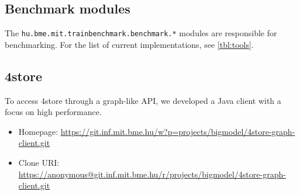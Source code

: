 \subsection{Benchmark modules}

The \texttt{hu.bme.mit.trainbenchmark.benchmark.*} modules are responsible for benchmarking. For the list of current implementations, see \autoref{tbl:tools}.

\subsection{4store}

To access 4store through a graph-like API, we developed a Java client with a focus on high performance.

\begin{itemize}
  \item Homepage: \url{https://git.inf.mit.bme.hu/w?p=projects/bigmodel/4store-graph-client.git}
  \item Clone URI: \url{https://anonymous@git.inf.mit.bme.hu/r/projects/bigmodel/4store-graph-client.git}
\end{itemize}


